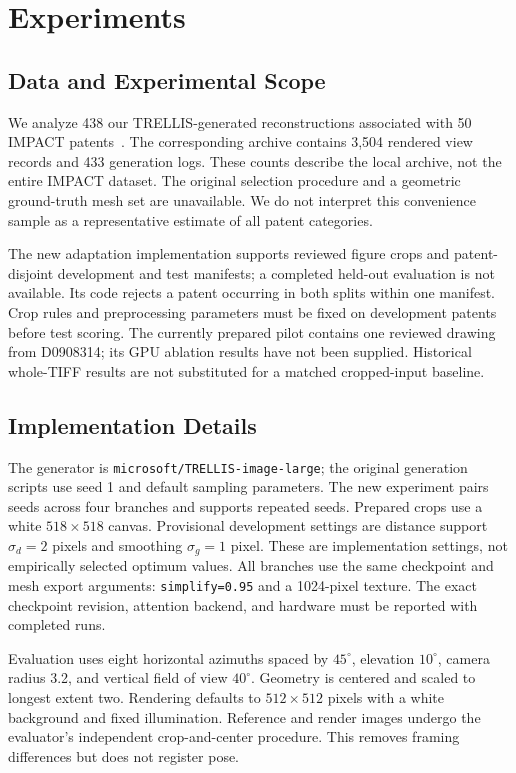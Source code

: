 \section{Experiments}
\label{sec:experiments}

\subsection{Data and Experimental Scope}
We analyze 438 our TRELLIS-generated reconstructions associated with 50 IMPACT
patents~\cite{shomee2024impact}. The corresponding archive contains 3,504 rendered
view records and 433 generation logs. These counts describe the local archive,
not the entire IMPACT dataset. The original selection procedure and a geometric
ground-truth mesh set are unavailable. We do not interpret this convenience
sample as a representative estimate of all patent categories.

The new adaptation implementation supports reviewed figure crops and patent-disjoint
development and test manifests; a completed held-out evaluation is not available. Its code rejects a patent occurring in both
splits within one manifest. Crop rules and preprocessing parameters must be
fixed on development patents before test scoring. The currently prepared pilot
contains one reviewed drawing from D0908314; its GPU ablation results have not
been supplied. Historical whole-TIFF results are not substituted for a matched
cropped-input baseline.

\subsection{Implementation Details}
\label{sec:implementation}
The generator is \texttt{microsoft/TRELLIS-image-large}; the original generation scripts use
seed 1 and default sampling parameters. The new experiment pairs seeds across
four branches and supports repeated seeds. Prepared crops use a white
$518\times518$ canvas. Provisional development settings are distance support
$\sigma_d=2$ pixels and smoothing $\sigma_g=1$ pixel. These are implementation
settings, not empirically selected optimum values. All branches use the same
checkpoint and mesh export arguments: \texttt{simplify=0.95} and a 1024-pixel
texture. The exact checkpoint revision, attention backend, and hardware must be
reported with completed runs.

Evaluation uses eight horizontal azimuths spaced by $45^{\circ}$, elevation
$10^{\circ}$, camera radius 3.2, and vertical field of view $40^{\circ}$. Geometry
is centered and scaled to longest extent two. Rendering defaults to
$512\times512$ pixels with a white background and fixed illumination.
Reference and render images undergo the evaluator's independent crop-and-center
procedure. This removes framing differences but does not register pose.

